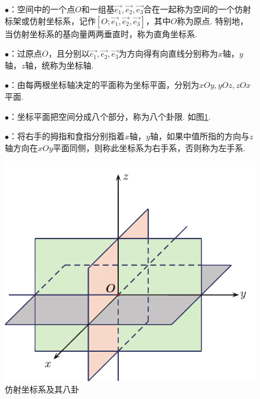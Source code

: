 \begin{enumerate}[]
	\setlength{\itemindent}{3em}
	\setlength{\topsep}{0.01em}
	\setlength{\itemsep}{0.01em}
	\begin{figure}[h]
		\begin{minipage}{0.6\linewidth}
			\item $\bullet$：空间中的一个点$O$和一组基$\overrightarrow{e_1},\overrightarrow{e_2},\overrightarrow{e_3}$合在一起称为空间的一个{\color{dy2}仿射标架}或{\color{dy2}仿射坐标系}，记作$[O;\overrightarrow{e_1},\overrightarrow{e_2},\overrightarrow{e_3}]$，其中$O$称为{\color{dy2}原点}. {\color{dy}特别地，当仿射坐标系的基向量两两垂直时，称为直角坐标系}.
			\item $\bullet$：过原点$O$，且分别以$\overrightarrow{e_1},\overrightarrow{e_2},\overrightarrow{e_3}$为方向得有向直线分别称为$x$轴，$y$轴，$z$轴，统称为{\color{dy2}坐标轴}. 
			\item$\bullet$：由每两根坐标轴决定的平面称为{\color{dy2}坐标平面}，分别为$xOy,yOz,zOx$平面. 
			\item $\bullet$：坐标平面把空间分成八个部分，称为八个{\color{dy2}卦限}. 如图\ref{八卦}. 
			\item $\bullet$：将右手的拇指和食指分别指着$x$轴，$y$轴，如果中值所指的方向与$z$轴方向在$xOy$平面同侧，则称此坐标系为{\color{dy2}右手系}，否则称为{\color{dy2}左手系}. 
		\end{minipage}
		\hfill
		\begin{minipage}{0.4\linewidth}
			\includegraphics[scale=0.75]{picture/C-1/1.1/BG.pdf}
			\caption{仿射坐标系及其八卦}
			\label{八卦}
		\end{minipage}
	\end{figure}
\end{enumerate}
\jg
\jg

